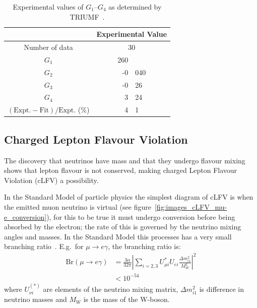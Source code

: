 \begin{table}
  \begin{center}
  \begin{tabular}{c | r@{.}l }
                                                              & \multicolumn{2}{c|}{Experimental Value} \\
    \hline
    Number of data                                            & \multicolumn{2}{c|}{30}                 \\
    \hline
    \( G_1 \)                                                 &             260 &                       \\
    \( G_2 \)                                                 &              -0 & 040                   \\
    \( G_3 \)                                                 &              -0 & 26                    \\
    \( G_4 \)                                                 &               3 & 24                    \\
    \hline
    \( (\textrm{Expt.} - \textrm{Fit})/\textrm{Expt.} \) (\%) &               4 & 1                     \\
  \end{tabular}
  \end{center}
  \caption{Experimental values of \( G_1 \)--\( G_4 \) as determined by TRIUMF~\cite{suzuki_mu_capture_rates}.}
  \label{tab:g1_to_g4}
\end{table}


\subsection{Charged Lepton Flavour Violation} %
\label{sec:charged_lepton_flavour_violation}
The discovery that neutrinos have mass and that they undergo flavour mixing shows that lepton flavour is not conserved, making charged Lepton Flavour Violation (cLFV) a possibility. 

In the Standard Model of particle physics the simplest diagram of cLFV is when the emitted muon neutrino is virtual (see figure~\ref{fig:images_cLFV_mu-e_conversion}), for this to be true it must undergo conversion before being absorbed by the electron; the rate of this is governed by the neutrino mixing angles and masses. In the Standard Model this processes has a very small branching ratio~\cite{effective_lagrangian_for_clfv}. E.g.\ for \( \mu\rightarrow e\gamma \), the branching ratio is: 
\begin{align}
  \text{Br}(\mu\rightarrow e\gamma) 
    &= \frac{3\alpha}{32\pi}
      \left|\sum\limits_{i=2,3} U^*_{\mu i} U_{ei}
            \frac{\Delta m^2_{i1}}{M^2_W}
     \right|^2 \\
    &< 10^{-54} \label{equ:clfv_branching_ratio}
\end{align}
where \( U_{\nu i}^{(*)} \) are elements of the neutrino mixing matrix, \(\Delta m^2_{i1}\) is difference in neutrino masses and \(M_{W}\) is the mass of the W-boson.

